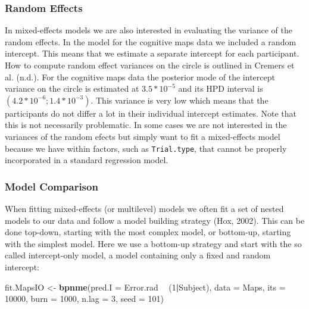 \documentclass[11pt,]{article}
\newenvironment{Shaded}{\begin{snugshade}}{\end{snugshade}}
\newcommand{\DataTypeTok}[1]{\textcolor[rgb]{0.13,0.29,0.53}{#1}}
\newcommand{\DecValTok}[1]{\textcolor[rgb]{0.00,0.00,0.81}{#1}}
\newcommand{\KeywordTok}[1]{\textcolor[rgb]{0.13,0.29,0.53}{\textbf{#1}}}
\newcommand{\NormalTok}[1]{#1}
\newcommand{\OperatorTok}[1]{\textcolor[rgb]{0.81,0.36,0.00}{\textbf{#1}}}
\newcommand{\StringTok}[1]{\textcolor[rgb]{0.31,0.60,0.02}{#1}}
\begin{document}
\subsubsection{Random Effects}\label{ranme}

In mixed-effects models we are also interested in evaluating the
variance of the random effects. In the model for the cognitive maps data
we included a random intercept. This means that we estimate a separate
intercept for each participant. How to compute random effect variances
on the circle is outlined in Cremers et al. (n.d.). For the cognitive
maps data the posterior mode of the intercept variance on the circle is
estimated at \(3.5*10^{-5}\) and its HPD interval is
\((4.2*10^{-6}; 1.4*10^{-3})\). This variance is very low which means
that the participants do not differ a lot in their individual intercept
estimates. Note that this is not necessarily problematic. In some cases
we are not interested in the variances of the random efects but simply
want to fit a mixed-effects model because we have within factors, such
as \verb|Trial.type|, that cannot be properly incorporated in a standard
regression model.

\subsubsection{Model Comparison}\label{fitme}

When fitting mixed-effects (or multilevel) models we often fit a set of
nested models to our data and follow a model building strategy (Hox,
2002). This can be done top-down, starting with the most complex model,
or bottom-up, starting with the simplest model. Here we use a bottom-up
strategy and start with the so called intercept-only model, a model
containing only a fixed and random intercept:

\begin{Shaded}
\begin{Highlighting}[]
\NormalTok{fit.MapsIO <-}\StringTok{ }\KeywordTok{bpnme}\NormalTok{(}\DataTypeTok{pred.I =}\NormalTok{ Error.rad }\OperatorTok{~}\StringTok{ }\NormalTok{(}\DecValTok{1}\OperatorTok{|}\NormalTok{Subject),}
                    \DataTypeTok{data =}\NormalTok{ Maps,}
                    \DataTypeTok{its =} \DecValTok{10000}\NormalTok{, }\DataTypeTok{burn =} \DecValTok{1000}\NormalTok{, }\DataTypeTok{n.lag =} \DecValTok{3}\NormalTok{, }\DataTypeTok{seed =} \DecValTok{101}\NormalTok{)}
\end{Highlighting}
\end{Shaded}
\end{document}
